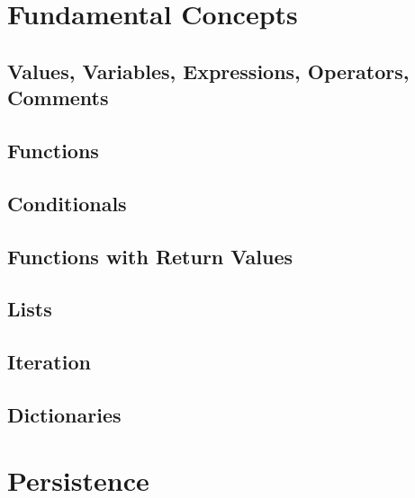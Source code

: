 \documentclass[10pt, a4paper]{beamer} %
\begin{document}
\section{Fundamental Concepts} %
\label{sec:fundamental_concepts}

\subsection{Values, Variables, Expressions, Operators, Comments} %
\label{sub:values_variables_expressions_operators_comments}


\subsection{Functions} %
\label{sub:functions}


\subsection{Conditionals} %
\label{sub:conditionals}


\subsection{Functions with Return Values} %
\label{sub:functions_with_return_values}


\subsection{Lists} %
\label{sub:lists}


\subsection{Iteration} %
\label{sub:iteration}


\subsection{Dictionaries} %
\label{sub:dictionaries}


\section{Persistence} %
\label{sec:persistence}

\end{document}
